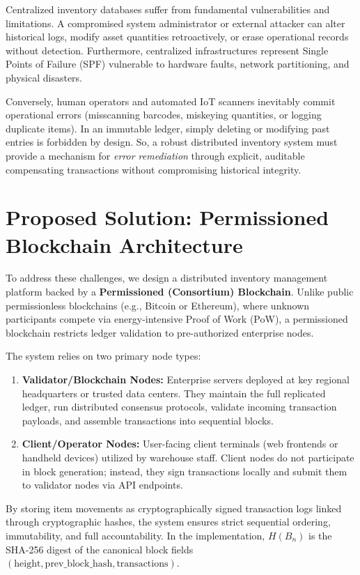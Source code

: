 \documentclass[11pt, a4paper, oneside]{memoir}
\begin{document}
Centralized inventory databases suffer from fundamental vulnerabilities and limitations. 
A compromised system administrator or external attacker can alter historical logs, modify asset quantities retroactively, or erase operational records without detection. 
Furthermore, centralized infrastructures represent Single Points of Failure (SPF) vulnerable to hardware faults, network partitioning, and physical disasters.

Conversely, human operators and automated IoT scanners inevitably commit operational errors (misscanning barcodes, miskeying quantities, or logging duplicate items). 
In an immutable ledger, simply deleting or modifying past entries is forbidden by design. 
So, a robust distributed inventory system must provide a mechanism for \textit{error remediation} through explicit, auditable compensating transactions without compromising historical integrity.

\section{Proposed Solution: Permissioned Blockchain Architecture}
To address these challenges, we design a distributed inventory management platform backed by a \textbf{Permissioned (Consortium) Blockchain}. Unlike public permissionless blockchains (e.g., Bitcoin or Ethereum), where unknown participants compete via energy-intensive Proof of Work (PoW), a permissioned blockchain restricts ledger validation to pre-authorized enterprise nodes.

The system relies on two primary node types:
\begin{enumerate}
    \item \textbf{Validator/Blockchain Nodes:} Enterprise servers deployed at key regional headquarters or trusted data centers. They maintain the full replicated ledger, run distributed consensus protocols, validate incoming transaction payloads, and assemble transactions into sequential blocks.
    \item \textbf{Client/Operator Nodes:} User-facing client terminals (web frontends or handheld devices) utilized by warehouse staff. Client nodes do not participate in block generation; instead, they sign transactions locally and submit them to validator nodes via API endpoints.
\end{enumerate}

By storing item movements as cryptographically signed transaction logs linked
through cryptographic hashes, the system ensures strict sequential ordering,
immutability, and full accountability. In the implementation,
$H(B_n)$ is the SHA-256 digest of the canonical block fields
$(\text{height},\text{prev\_block\_hash},\text{transactions})$.
\end{document}
